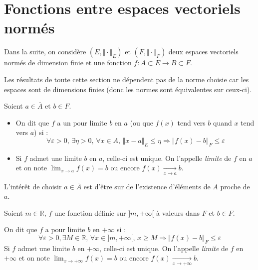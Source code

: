 \documentclass[a4paper,10pt]{report}
\begin{document}
\section{Fonctions entre espaces vectoriels normés}

Dans la suite, on considère $(E, \Vert \cdot \Vert_E)$ et $(F, \Vert \cdot \Vert_F)$ deux espaces vectoriels normés de dimension finie et une fonction $f : A \subset E \rightarrow B \subset F$.

\begin{Theoreme}{} Les résultats de toute cette section ne dépendent pas de la norme choisie car les espaces sont de dimensions finies (donc les normes sont équivalentes sur ceux-ci).
\end{Theoreme}


\begin{TheoremeDefinition}{} Soient $a \in \overline{A}$ et $b \in F$.

\begin{itemize}
\item On dit que $f$ a un pour limite $b$ en $a$ (ou que $f(x)$ tend vers $b$ quand $x$ tend vers $a$) si :
$$ \forall \varepsilon >0, \, \exists \eta > 0, \, \forall x \in A, \, \Vert x- a \Vert_E \leq \eta \Rightarrow \Vert f(x) - b \Vert_F \leq \varepsilon$$
\item Si $f$ admet une limite $b$ en $a$, celle-ci est unique. On l'appelle \emph{limite} de $f$ en $a$ et on note $\lim_{x \rightarrow a} f(x) = b$ ou encore $f(x) \underset{x \rightarrow a}{\rightarrow} b$.
\end{itemize}
\end{TheoremeDefinition}

\begin{Remarque}{} L'intérêt de choisir $a \in \overline{A}$ est d'être sur de l'existence d'éléments de $A$ \og proche \fg de $a$.
\end{Remarque}

\begin{Definition}{} Soient $m \in \mathbb{R}$, $f$ une fonction définie sur $]m, + \infty[$ à valeurs dans $F$ et $b \in F$.

On dit que $f$ a pour limite $b$ en $+ \infty$ si :
$$ \forall \varepsilon>0, \exists M \in \mathbb{R}, \, \forall x \in ]m, + \infty[, \, x \geq M \Rightarrow \Vert f(x)- b \Vert_F \leq \varepsilon$$
 Si $f$ admet une limite $b$ en $+ \infty$, celle-ci est unique. On l'appelle \emph{limite} de $f$ en $+ \infty$ et on note \newline $\lim_{x \rightarrow + \infty} f(x) = b$ ou encore $f(x) \underset{x \rightarrow + \infty}{\rightarrow} b$.
\end{Definition}
\end{document}
